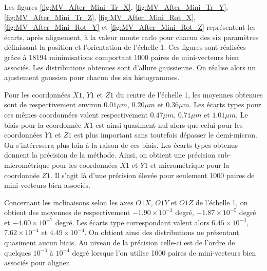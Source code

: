   \medskip
  
  Les figures \ref{fig:MV_After_Mini_Tr_X}, \ref{fig:MV_After_Mini_Tr_Y}, \ref{fig:MV_After_Mini_Tr_Z}, \ref{fig:MV_After_Mini_Rot_X}, \ref{fig:MV_After_Mini_Rot_Y} et \ref{fig:MV_After_Mini_Rot_Z} repr\'esentent les \'ecarts, apr\`es alignement, \`a la valeur monte carlo pour chacun des six param\`etres d\'efinissant la position et l'orientation de l'\'echelle 1. Ces figures sont r\'ealis\'ees grâce \`a 18194 minimisations comportant 1000 paires de mini-vecteurs bien associ\'es. Les distributions obtenues sont d'allure gaussienne. On r\'ealise alors un ajustement gaussien pour chacun des six histogrammes.
  
  \medskip

  Pour les coordonn\'ees $X1$, $Y1$ et $Z1$ du centre de l'\'echelle 1, les moyennes obtenues sont de respectivement environ $0.01 \mu m$, $0.20 \mu m$ et $0.36 \mu m$. Les \'ecarts types pour ces m\^emes coordonn\'ees valent respectivement $0.47 \mu m$, $0.71 \mu m$ et $1.01 \mu m$. Le biais pour la coordonn\'ee $X1$ est ainsi quasiment nul alors que celui pour les coordonn\'ees $Y1$ et $Z1$ est plus important sans toutefois d\'epasser le demi-micron. On s'int\'eressera plus loin \`a la raison de ces biais. Les \'ecarts types obtenus donnent la pr\'ecision de la m\'ethode. Ainsi, on obtient une pr\'ecision sub-microm\'etrique pour les coordonn\'ees $X1$ et $Y1$ et microm\'etrique pour la coordonn\'ee $Z1$. Il s'agit l\`a d'une pr\'ecision \'elev\'ee pour seulement 1000 paires de mini-vecteurs bien associ\'es.
  
  \medskip
  
  Concernant les inclinaisons selon les axes $O1X$, $O1Y$ et $O1Z$ de l'\'echelle 1, on obtient des moyennes de respectivement $-1.90 \times 10^{-3}$ degr\'e, $-1.87 \times 10^{-5}$ degr\'e et $-4.00 \times 10^{-7}$ degr\'e. Les \'ecarts type correspondant valent alors $6.45 \times 10^{-3}$, $7.62 \times 10^{-4}$ et $4.49 \times 10^{-4}$. On obtient ainsi des distributions ne pr\'esentant quasiment aucun biais. Au niveau de la pr\'ecision celle-ci est de l'ordre de quelques $10^{-3}$ \`a $10^{-4}$ degr\'e lorsque l'on utilise 1000 paires de mini-vecteurs bien associ\'es pour aligner.
    
